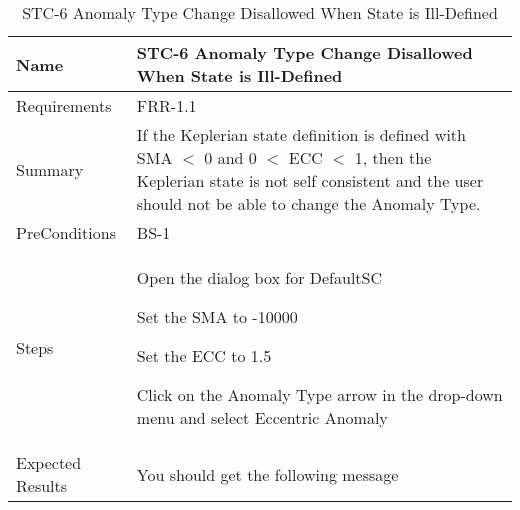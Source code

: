 


\begin{table}[htbp!]
\centering
      \begin{tabular}{|p{1.05 in} |p{4.75 in} |}
      \hline
         \rowcolor[rgb]{0.8,0.8,0.8} Name & STC-6 Anomaly Type Change Disallowed When State is Ill-Defined\\  \hline
         Requirements & FRR-1.1\\  \hline
         Summary &
         If the Keplerian state definition is defined with SMA $<$ 0 and 0 $<$ ECC $<$ 1, then
         the Keplerian state is not self consistent and the user should not be able
         to change the Anomaly Type.
         \\     \hline
         PreConditions & BS-1\\   \hline
         Steps &
         \begin{compactenum}
            \item Open the dialog box for DefaultSC
            \item Set the SMA to -10000
            \item Set the ECC to 1.5
            \item Click on the Anomaly Type arrow in the drop-down menu and select Eccentric Anomaly
         \end{compactenum}
         \\ \hline
         Expected Results & You should get the following message \\      \hline
\end{tabular}
      \label{Table: TC-6}
      \caption{STC-6 Anomaly Type Change Disallowed When State is Ill-Defined}
\end{table} 